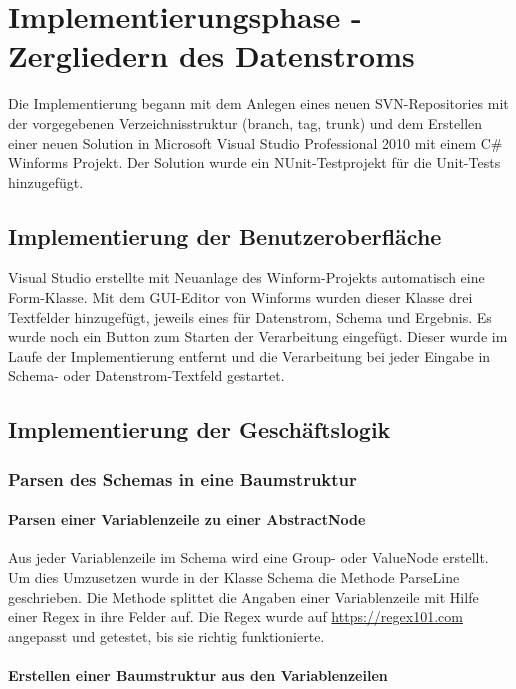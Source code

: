 \section{Implementierungsphase - Zergliedern des Datenstroms} 
\label{sec:ImplementierungsphaseDatenstromZergliedern}
Die Implementierung begann mit dem Anlegen eines neuen \ac{SVN}-Repositories mit der vorgegebenen Verzeichnisstruktur (branch, tag, trunk) und dem Erstellen einer neuen Solution in Microsoft Visual Studio Professional 2010 mit einem C\# Winforms Projekt. Der Solution wurde ein NUnit-Testprojekt für die Unit-Tests hinzugefügt.

\subsection{Implementierung der Benutzeroberfläche}
\label{sec:ImplementierungBenutzeroberflaeche}
Visual Studio erstellte mit Neuanlage des Winform-Projekts automatisch eine Form-Klasse. Mit dem GUI-Editor von Winforms wurden dieser Klasse drei Textfelder hinzugefügt, jeweils eines für Datenstrom, Schema und Ergebnis. Es wurde noch ein Button zum Starten der Verarbeitung eingefügt. Dieser wurde im Laufe der Implementierung  entfernt und die Verarbeitung bei jeder Eingabe in Schema- oder Datenstrom-Textfeld gestartet.

\subsection{Implementierung der Geschäftslogik}
\label{sec:ImplementierungGeschaeftslogik}
\subsubsection{Parsen des Schemas in eine Baumstruktur}
\label{sec:ParsenSchema}
\paragraph{Parsen einer Variablenzeile zu einer AbstractNode}

Aus jeder Variablenzeile im Schema wird eine Group- oder ValueNode erstellt. Um dies Umzusetzen wurde in der Klasse Schema die Methode ParseLine geschrieben. Die Methode splittet die Angaben einer Variablenzeile mit Hilfe einer \ac{Regex} in ihre Felder auf. Die \ac{Regex} wurde auf \href{https://regex101.com}{https://regex101.com} angepasst und getestet, bis sie richtig funktionierte.

\paragraph{Erstellen einer Baumstruktur aus den Variablenzeilen}

